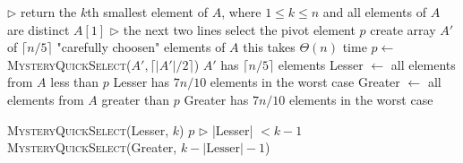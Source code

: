 \documentclass[11pt,fleqn]{exam}
\begin{document}
\vspace{.1in}

\begin{algorithmic}[1]
\State $\triangleright$ return the $k$th smallest element of $A$, where $1\le k \le n$ and all elements of $A$ are distinct
   \State \Return $A[1]$
\Else
   \State $\triangleright$ the next two lines select the pivot element $p$
   \State create array $A'$ of $\lceil n/5 \rceil$ "carefully choosen" elements of $A$ \Comment this takes $\Theta(n)$ time
    \State $p \gets$ \textsc{MysteryQuickSelect}($A', \lceil |A'|/2 \rceil$) \Comment $A'$ has  $\lceil n/5\rceil$ elements
    \State Lesser  $\gets$ all elements from $A$ less than $p$  \Comment Lesser has $7n/10$ elements in the worst case
    \State Greater $\gets$ all elements from $A$ greater than $p$ \Comment Greater has $7n/10$ elements in the worst case

       \State \Return \textsc{MysteryQuickSelect}(Lesser, $k$)
        \State \Return $p$
   \Else  \hspace{.2in} $\triangleright$ |Lesser| $< k-1$
       \State \Return \textsc{MysteryQuickSelect}(Greater, $k - |\mbox{Lesser}| - 1$)
   \EndIf
\EndIf
\EndFunction
\end{algorithmic}
\end{document}
